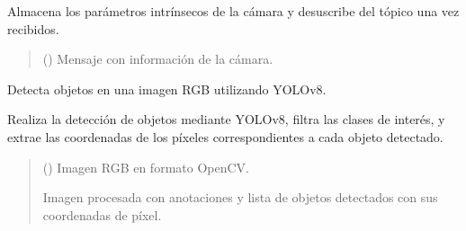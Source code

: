\documentclass[a4paper,10pt,spanish]{sphinxmanual}
\begin{document}
\begin{fulllineitems}
\begin{fulllineitems}
\sphinxAtStartPar
Almacena los parámetros intrínsecos de la cámara y desuscribe del tópico una vez recibidos.
\begin{quote}\begin{description}
\sphinxAtStartPar
{} () \textendash{} Mensaje con información de la cámara.

\end{description}\end{quote}

\end{fulllineitems}


\begin{fulllineitems}
\label{\detokenize{squad_object_detection_action:squad_object_detection_action.TurtleBotObjectDetectionAction.detect_objects}}
\pysigstartsignatures
{}
\pysigstopsignatures
\sphinxAtStartPar
Detecta objetos en una imagen RGB utilizando YOLOv8.

\sphinxAtStartPar
Realiza la detección de objetos mediante YOLOv8, filtra las clases de interés, y extrae las
coordenadas de los píxeles correspondientes a cada objeto detectado.
\begin{quote}\begin{description}
\sphinxAtStartPar
{} () \textendash{} Imagen RGB en formato OpenCV.

\sphinxAtStartPar
Imagen procesada con anotaciones y lista de objetos detectados con sus coordenadas de píxel.

\sphinxAtStartPar
{}

\end{description}\end{quote}

\end{fulllineitems}



\end{fulllineitems}
\end{document}
